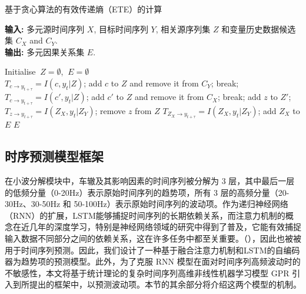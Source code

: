 \begin{algorithm}[htb]
\caption{基于贪心算法的有效传递熵（ETE）的计算}
\label{alg:SA1}
\hspace*{0.02in} {\bf 输入:} 多元源时间序列 $X$, 目标时间序列 $Y$, 相关源序列集 $Z$ 和变量历史数据候选集 $C_{X}$ and $C_{Y}$.\\
\hspace*{0.02in} {\bf 输出:} 多元因果关系集 $E$.\\
\begin{algorithmic}[1]
\STATE Initialise $\ Z=\emptyset$,  $\ E=\emptyset$
\\

    \STATE $T_{c\rightarrow y_{t+ \tau}} = I(c,y_{t}|Z)$;
        \STATE add $c$ to $Z$ and remove it from $C_{Y}$;
    \ELSE
        \STATE break;
    \ENDIF
\ENDFOR
{}
    \STATE $T_{c\rightarrow y_{t+ \tau}} = I(c',y_{t}|Z)$;
        \STATE add $c'$ to $Z$ and remove it from $C_{X}$;
    \ELSE
        \STATE break;
    \ENDIF
\ENDFOR
{}
    \STATE add $z$ to $Z'$;
    \STATE $T_{z\rightarrow y_{t+ \tau}} = I(Z_{X},y_{t}|Z_{Y})$;
        \STATE remove $z$ from $Z$
    \ENDIF
\ENDFOR
\STATE $T_{Z_{X}\rightarrow y_{t+ \tau}} = I(Z_{X},y_{t}|Z_{Y})$;
    \STATE add $Z_{X}$ to $E$
\ENDIF
\RETURN $E$
\end{algorithmic}
\end{algorithm}


\subsection{时序预测模型框架}
在小波分解模块中，车辙及其影响因素的时间序列被分解为 3 层，其中最后一层的低频分量（0-20Hz）表示原始时间序列的趋势项，所有 3 层的高频分量（20-30Hz、30-50Hz 和 50-100Hz）表示原始时间序列的波动项。作为递归神经网络（RNN）的扩展，LSTM能够捕捉时间序列的长期依赖关系，而注意力机制的概念在近几年的深度学习，特别是神经网络领域的研究中得到了普及，它能有效捕捉输入数据不同部分之间的依赖关系，这在许多任务中都至关重要。（\cite{33}），因此也被被用于时间序列预测。因此，我们设计了一种基于融合注意力机制和LSTM的自编码器为趋势项的预测模型。此外，为了克服 RNN 模型在面对时间序列高频波动时的不敏感性，本文将基于统计理论的复杂时间序列高维非线性机器学习模型 GPR 引入到所提出的框架中，以预测波动项。本节的其余部分将介绍这两个模型的机制。

